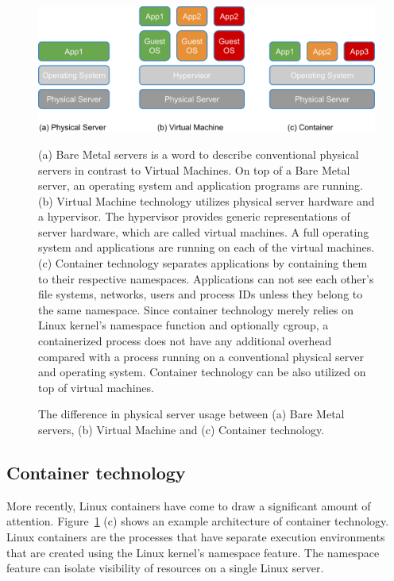 \begin{figure}[h]
\begin{center}
\includegraphics[width=0.8\columnwidth]{Figs/physical_vm_container.png}
\end{center}
\caption{
The difference in physical server usage between (a) Bare Metal servers, (b) Virtual Machine and (c) Container technology.
}

\centering\parbox[c]{0.9\columnwidth}{
(a) Bare Metal servers is a word to describe conventional physical servers in contrast to Virtual Machines.
On top of a Bare Metal server, an operating system and application programs are running.
(b) Virtual Machine technology utilizes physical server hardware and a hypervisor.
The hypervisor provides generic representations of server hardware, which are called virtual machines.
A full operating system and applications are running on each of the virtual machines.
(c) Container technology separates applications by containing them to their respective namespaces.
Applications can not see each other's file systems, networks, users and process IDs unless they belong to the same namespace.
Since container technology merely relies on Linux kernel's namespace function and optionally cgroup, a containerized process does not have any additional overhead compared with a process running on a conventional physical server and operating system.
Container technology can be also utilized on top of virtual machines.
}
\label{fig:physical_vm_container}
\end{figure}

\subsection{Container technology}

More recently, Linux containers\cite{menage2007adding} have come to draw a significant amount of attention.
Figure~\ref{fig:physical_vm_container} (c) shows an example architecture of container technology. 
Linux containers are the processes that have separate execution environments that are created using the Linux kernel's namespace feature.
The namespace feature can isolate visibility of resources on a single Linux server.

